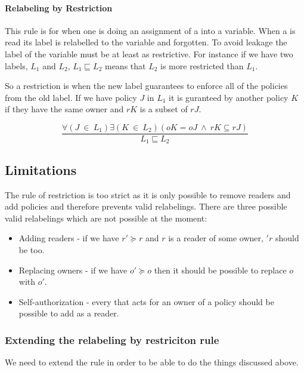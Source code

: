 \paragraph{Relabeling by Restriction}
This rule is for when one is doing an assignment of a \xvalue{} into a variable.
When a \xvalue{} is read its label is relabelled to the variable and forgotten.
To avoid leakage the label of the variable must be at least as restrictive.
For instance if we have two labels, $L_1$ and $L_2$, $L_1 \sqsubseteq L_2$ means that $L_2$ is more restricted than $L_1$.

So a restriction is when the new label guarantees to enforce all of the policies from the old label.
If we have policy $J$ in $L_1$ it is guranteed by another policy $K$ if they have the same owner and $rK$ is a subset of $rJ$.
\begin{definition}
$$\frac{\forall (J \ \in \ L_1) \exists (K \ \in \ L_2)(oK = oJ \ \wedge \ rK \subseteq rJ)}{L_1 \sqsubseteq L_2}$$
\end{definition}

\subsection{Limitations}
The rule of restriction is too strict as it is only possible to remove readers and add policies  and therefore prevents valid relabelings.
There are three possible valid relabelings which are not possible at the moment:
\begin{itemize}
\item Adding readers - if we have $r' \succeq r$ and $r$ is a reader of some owner, $'r$ should be too.
\item Replacing owners - if we have $o' \succeq o$ then it should be possible to replace $o$ with $o'$.
\item Self-authorization - every \principal{} that acts for an owner of a policy should be possible to add as a reader.
\end{itemize}

\subsubsection{Extending the relabeling by restriciton rule}
We need to extend the rule in order to be able to do the things discussed above.

